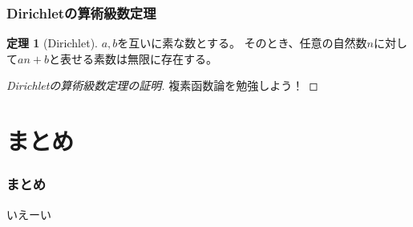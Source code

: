 \documentclass[dvipdfmx,11pt,notheorems]{beamer}
\theoremstyle{definition}
\newtheorem{theorem}{定理}
\begin{document}

\begin{frame}\frametitle{Dirichletの算術級数定理}

\begin{theorem}[Dirichlet]
$a,b$を互いに素な数とする。
そのとき、任意の自然数$n$に対して$an + b$と表せる素数は無限に存在する。
\end{theorem}

\begin{proof}[Dirichletの算術級数定理の証明]
複素函数論を勉強しよう！
\end{proof}

\end{frame}

\section{まとめ}

\begin{frame}\frametitle{まとめ}
いえーい
\end{frame}
\end{document}
